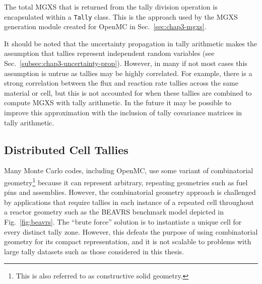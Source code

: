 \noindent The total \ac{MGXS} that is returned from the tally division operation is encapsulated within a \texttt{Tally} class. This is the approach used by the \ac{MGXS} generation module created for OpenMC in Sec.~\ref{sec:chap3-mgxs}.

It should be noted that the uncertainty propagation in tally arithmetic makes the assumption that tallies represent independent random variables (see Sec.~\ref{subsec:chap3-uncertainty-prop}). However, in many if not most cases this assumption is untrue as tallies may be highly correlated. For example, there is a strong correlation between the flux and reaction rate tallies across the same material or cell, but this is not accounted for when these tallies are combined to compute \ac{MGXS} with tally arithmetic. In the future it may be possible to improve this approximation with the inclusion of tally covariance matrices in tally arithmetic.

\subsection{Distributed Cell Tallies}
\label{sec:chap3-distribcells}

Many Monte Carlo codes, including OpenMC, use some variant of combinatorial geometry\footnote{This is also referred to as constructive solid geometry.} because it can represent arbitrary, repeating geometries such as fuel pins and assemblies. However, the combinatorial geometry approach is challenged by applications that require tallies in each instance of a repeated cell throughout a reactor geometry such as the \ac{BEAVRS} benchmark model depicted in Fig.~\ref{fig:beavrs}. The ``brute force'' solution is to instantiate a unique cell for every distinct tally zone. However, this defeats the purpose of using combinatorial geometry for its compact representation, and it is not scalable to problems with large tally datasets such as those considered in this thesis.

